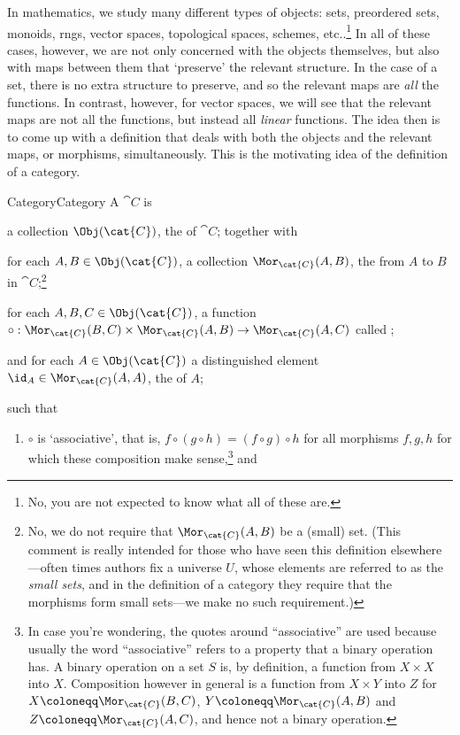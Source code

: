 In mathematics, we study many different types of objects:  sets, preordered sets, monoids, rngs, vector spaces, topological spaces, schemes, etc..\footnote{No, you are not expected to know what all of these are.}  In all of these cases, however, we are not only concerned with the objects themselves, but also with maps between them that `preserve' the relevant structure.  In the case of a set, there is no extra structure to preserve, and so the relevant maps are \emph{all} the functions.  In contrast, however, for vector spaces, we will see that the relevant maps are not all the functions, but instead all \emph{linear} functions.  The idea then is to come up with a definition that deals with both the objects and the relevant maps, or morphisms, simultaneously.  This is the motivating idea of the definition of a category.
\begin{dfn}{Category}{Category}
A  $\cat{C}$ is
\begin{data}
\item a collection $\Obj (\cat{C})$, the  of $\cat{C}$; together with
\item for each $A,B\in \Obj (\cat{C})$, a collection $\Mor _{\cat{C}}(A,B)$, the  from $A$ to $B$ in $\cat{C}$;\footnote{No, we do not require that $\Mor _{\cat{C}}(A,B)$ be a (small) set.  (This comment is really intended for those who have seen this definition elsewhere---often times authors fix a universe $U$, whose elements are referred to as the \emph{small sets}, and in the definition of a category they require that the morphisms form small sets---we make no such requirement.)}
\item for each $A,B,C\in \Obj (\cat{C})$, a function $\circ :\Mor _{\cat{C}}(B,C)\times \Mor _{\cat{C}}(A,B)\rightarrow \Mor _{\cat{C}}(A,C)$ called ;
\item and for each $A\in \Obj (\cat{C})$ a distinguished element $\id _{A}\in \Mor _{\cat{C}}(A,A)$, the  of $A$;
\end{data}
such that
\begin{enumerate}
\item $\circ$ is `associative', that is, $f\circ (g\circ h)=(f\circ g)\circ h$ for all morphisms $f,g,h$ for which these composition make sense,\footnote{In case you're wondering, the quotes around ``associative'' are used because usually the word ``associative'' refers to a property that a binary operation has.  A binary operation on a set $S$ is, by definition, a function from $X\times X$ into $X$.  Composition however in general is a function from $X\times Y$ into $Z$ for $X\coloneqq \Mor _{\cat{C}}(B,C)$, $Y\coloneqq \Mor _{\cat{C}}(A,B)$ and $Z\coloneqq \Mor _{\cat{C}}(A,C)$, and hence not a binary operation.} and

\end{enumerate}
\end{dfn}
